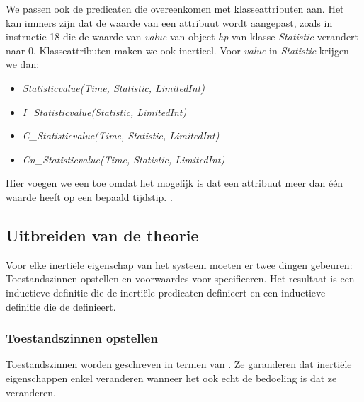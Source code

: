 \DIFdelend We passen ook de predicaten die overeenkomen met klasseattributen aan. Het kan immers zijn dat de waarde van een attribuut wordt aangepast, zoals in instructie 18 die de waarde van \textit{value} van object \textit{hp} van klasse \textit{Statistic} verandert naar 0. Klasseattributen maken we ook inertieel. Voor \textit{value} in \textit{Statistic} krijgen we dan:

\begin{itemize}
	\item \textit{Statisticvalue(Time, Statistic, LimitedInt)}
	\item \textit{I\_Statisticvalue(Statistic, LimitedInt)}
	\item \textit{C\_Statisticvalue(Time, Statistic, LimitedInt)}
	\item \DIFaddbegin {}\DIFaddend \textit{Cn\_Statisticvalue(Time, Statistic, LimitedInt)}
\end{itemize}

Hier voegen we een \DIFdelbegin \textit{}%
\DIFdelend \DIFaddbegin {}\DIFaddend toe omdat het mogelijk is dat een attribuut meer dan \'e\'en waarde heeft op een bepaald tijdstip. \DIFdelbegin {}\DIFdelend \DIFaddbegin {}\DIFaddend .

\subsection{Uitbreiden van de theorie}
Voor elke inerti\"ele eigenschap van het systeem moeten er twee dingen gebeuren: Toestandszinnen opstellen en voorwaardes voor \DIFdelbegin \textit{}%
\textit{}%
\DIFdelend \DIFaddbegin {}\DIFaddend specificeren. Het resultaat is een inductieve definitie die de inerti\"ele predicaten definieert en een inductieve definitie die de \DIFdelbegin \textit{}%
\textit{}%
\DIFdelend \DIFaddbegin {}\DIFaddend definieert.

\subsubsection{Toestandszinnen opstellen}
Toestandszinnen worden geschreven in termen van \DIFdelbegin \textit{}%
\textit{}%
\textit{}%
\DIFdelend \DIFaddbegin {}\DIFaddend . Ze garanderen dat inerti\"ele eigenschappen enkel veranderen wanneer het ook echt de bedoeling is dat ze veranderen.

